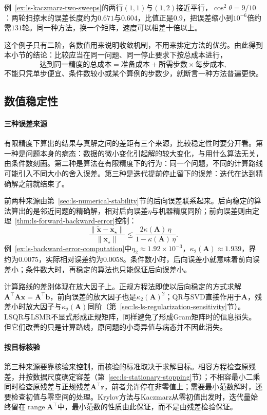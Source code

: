 例~\ref{ex:ls-kaczmarz-two-sweeps}的两行$(1,1)$与$(1,2)$接近平行，$\cos^2\theta=9/10$：两轮扫掠末的误差长度约为$0.671$与$0.604$，比值正是$0.9$，把误差缩小到$10^{-6}$倍约需$131$轮。同一种方法，换一个矩阵，速度可以相差十倍以上。

这个例子只有二阶，各数值用来说明收敛机制，不用来排定方法的优劣。由此得到本小节的结论：比较应当在同一问题、同一停止要求下按总成本进行，
\[
 \text{达到同一精度的总成本}=\text{准备成本}+\text{所需步数}\times\text{每步成本},
\]
不能只凭单步便宜、条件数较小或某个算例的步数少，就断言一种方法普遍更快。

\subsection{数值稳定性}
\label{sec:ls-method-selection-stability}

\paragraph{三种误差来源}
有限精度下算出的结果与真解之间的差距有三个来源，比较稳定性时要分开看。第一种是问题本身的病态：数据的微小变化引起解的较大变化，与用什么算法无关，由条件数刻画。第二种是算法在有限精度下的行为：同一个问题，不同的计算路线可能引入不同大小的舍入误差。第三种是迭代提前停止留下的误差：迭代在达到精确解之前就结束了。

前两种来源由第~\ref{sec:ls-numerical-stability}节的后向误差联系起来。后向稳定的算法算出的是邻近问题的精确解，相对后向误差$\eta$与机器精度同阶；前向误差则由定理~\ref{thm:ls-forward-backward-error}控制：
\[
 \frac{\lVert\tilde{\bm x}-\bm x_\star\rVert}{\lVert\bm x_\star\rVert}\leq\frac{2\kappa(\bm A)\,\eta}{1-\kappa(\bm A)\,\eta}.
\]
例~\ref{ex:ls-backward-error-computation}中$\eta_2\approx1.92\times10^{-3}$，$\kappa_2(\bm A)\approx1.939$，界约为$0.0075$，实际相对误差约为$0.0058$。条件数小时，后向误差小就意味着前向误差小；条件数大时，再稳定的算法也只能保证后向误差小。

计算路线的差别体现在放大因子上。正规方程法即使以后向稳定的方式求解$\bm A^\top\bm A\bm x=\bm A^\top\bm b$，前向误差的放大因子也是$\kappa_2(\bm A)^2$；QR与SVD直接作用于$\bm A$，残差小时放大因子与$\kappa_2(\bm A)$同阶（第~\ref{sec:ls-ls-regularization-sensitivity}节）。LSQR与LSMR不显式形成正规矩阵，同样避免了形成Gram矩阵时的信息损失。但它们改善的只是计算路线，原问题的小奇异值与病态并不因此消失。

\paragraph{按目标核验}
第三种来源要靠核验来控制，而核验的标准取决于求解目标。相容方程检查原残差，并按数据尺度确定容差（第~\ref{sec:ls-stationary-stopping}节）；不相容最小二乘同时检查原残差与正规残差$\bm A^\top\bm r$，前者允许停在非零值上；需要最小范数解时，还要检查初值与零空间的处理。Krylov方法与Kaczmarz从零初值出发时，迭代量始终留在$\operatorname{range}\bm A^\top$中，最小范数的性质由此保证，而不是由残差检验保证。

